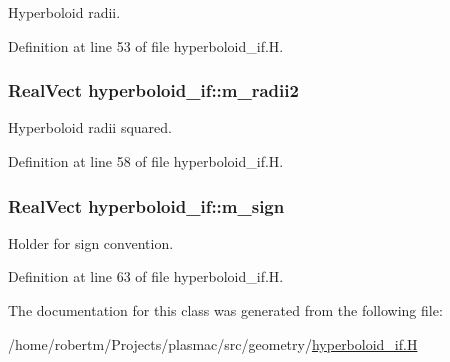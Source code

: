 Hyperboloid radii. 



Definition at line 53 of file hyperboloid\+\_\+if.\+H.

\subsubsection[{\texorpdfstring{m\+\_\+radii2}{m_radii2}}]{\setlength{\rightskip}{0pt plus 5cm}Real\+Vect hyperboloid\+\_\+if\+::m\+\_\+radii2\hspace{0.3cm}{\ttfamily [protected]}}\hypertarget{classhyperboloid__if_aa173c15f1175222e2f8bf91ddb335df7}{}\label{classhyperboloid__if_aa173c15f1175222e2f8bf91ddb335df7}


Hyperboloid radii squared. 



Definition at line 58 of file hyperboloid\+\_\+if.\+H.

\subsubsection[{\texorpdfstring{m\+\_\+sign}{m_sign}}]{\setlength{\rightskip}{0pt plus 5cm}Real\+Vect hyperboloid\+\_\+if\+::m\+\_\+sign\hspace{0.3cm}{\ttfamily [protected]}}\hypertarget{classhyperboloid__if_a48189ee705661052674df1e7745edc3f}{}\label{classhyperboloid__if_a48189ee705661052674df1e7745edc3f}


Holder for sign convention. 



Definition at line 63 of file hyperboloid\+\_\+if.\+H.



The documentation for this class was generated from the following file\+:\begin{DoxyCompactItemize}
\item 
/home/robertm/\+Projects/plasmac/src/geometry/\hyperlink{hyperboloid__if_8H}{hyperboloid\+\_\+if.\+H}\end{DoxyCompactItemize}
